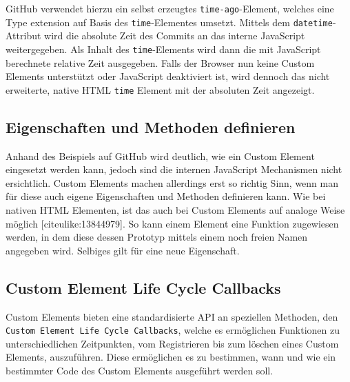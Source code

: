 GitHub verwendet hierzu ein selbst erzeugtes \texttt{time-ago}-Element,
welches eine Type extension auf Basis des \texttt{time}-Elementes
umsetzt. Mittels dem \texttt{datetime}-Attribut wird die absolute Zeit
des Commits an das interne JavaScript weitergegeben. Als Inhalt des
\texttt{time}-Elements wird dann die mit JavaScript berechnete relative
Zeit ausgegeben. Falls der Browser nun keine Custom Elements unterstützt
oder JavaScript deaktiviert ist, wird dennoch das nicht erweiterte,
native HTML \texttt{time} Element mit der absoluten Zeit angezeigt.

\subsection{Eigenschaften und Methoden
definieren}\label{eigenschaften-und-methoden-definieren}

Anhand des Beispiels auf GitHub wird deutlich, wie ein Custom Element
eingesetzt werden kann, jedoch sind die internen JavaScript Mechanismen
nicht ersichtlich. Custom Elements machen allerdings erst so richtig
Sinn, wenn man für diese auch eigene Eigenschaften und Methoden
definieren kann. Wie bei nativen HTML Elementen, ist das auch bei Custom
Elements auf analoge Weise möglich {[}citeulike:13844979{]}. So kann
einem Element eine Funktion zugewiesen werden, in dem diese dessen
Prototyp mittels einem noch freien Namen angegeben wird. Selbiges gilt
für eine neue Eigenschaft.

\begin{Shaded}
\begin{Highlighting}[]
 \OperatorTok{=}  \NormalTok{() }\OperatorTok{\{}
  \NormalTok{(}\NormalTok{)}\OperatorTok{;}
\OperatorTok{\};}

 \OperatorTok{=} \OperatorTok{;}
\end{Highlighting}
\end{Shaded}

\subsection{Custom Element Life Cycle
Callbacks}\label{custom-element-life-cycle-callbacks}

Custom Elements bieten eine standardisierte API an speziellen Methoden,
den \texttt{Custom\ Element\ Life\ Cycle\ Callbacks}, welche es
ermöglichen Funktionen zu unterschiedlichen Zeitpunkten, vom
Registrieren bis zum löschen eines Custom Elements, auszuführen. Diese
ermöglichen es zu bestimmen, wann und wie ein bestimmter Code des Custom
Elements ausgeführt werden soll.

